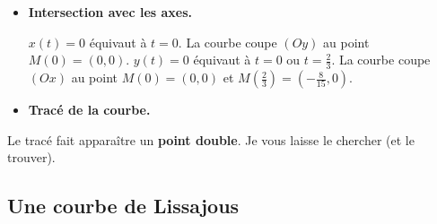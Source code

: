 \documentclass[class=report,crop=false]{standalone}
\begin{document}
\begin{exemple}
\begin{itemize}
  \item \textbf{Intersection avec les axes.}

$x(t)=0$ équivaut à $t=0$.
La courbe coupe $(Oy)$ au point $M(0)=(0,0)$. $y(t)=0$
équivaut à $t=0$ ou $t=\frac{2}{3}$. La courbe coupe $(Ox)$ au point $M(0)=(0,0)$ et
$M(\frac{2}{3})=(-\frac{8}{15},0)$.


  \item \textbf{Tracé de la courbe.}
\end{itemize}


Le tracé fait apparaître un \textbf{point double}. Je vous laisse le chercher (et le trouver).
\end{exemple}




\subsection{Une courbe de Lissajous}
\end{document}
